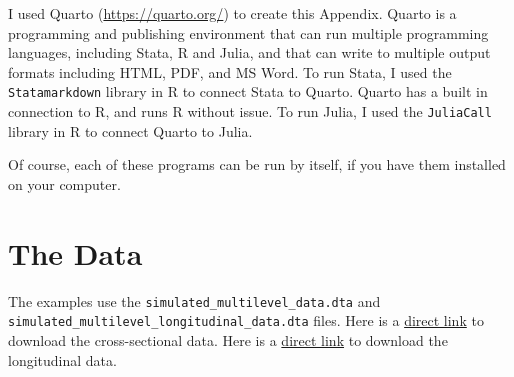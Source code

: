 \documentclass[
  letterpaper,
  DIV=11,
  numbers=noendperiod]{scrreprt}
\begin{document}
\begin{tcolorbox}[enhanced jigsaw, colframe=quarto-callout-tip-color-frame, bottomrule=.15mm, opacitybacktitle=0.6, bottomtitle=1mm, toptitle=1mm, colbacktitle=quarto-callout-tip-color!10!white, arc=.35mm, toprule=.15mm, opacityback=0, rightrule=.15mm, title=\textcolor{quarto-callout-tip-color}{\faLightbulb}\hspace{0.5em}{Running Statistical Packages in Quarto}, leftrule=.75mm, colback=white, breakable, coltitle=black, left=2mm, titlerule=0mm]

I used Quarto (\url{https://quarto.org/}) to create this Appendix.
Quarto is a programming and publishing environment that can run multiple
programming languages, including Stata, R and Julia, and that can write
to multiple output formats including HTML, PDF, and MS Word. To run
Stata, I used the \texttt{Statamarkdown} library in R to connect Stata
to Quarto. Quarto has a built in connection to R, and runs R without
issue. To run Julia, I used the \texttt{JuliaCall} library in R to
connect Quarto to Julia.

Of course, each of these programs can be run by itself, if you have them
installed on your computer.

\end{tcolorbox}

\section{The Data}\label{sec-data}

\begin{tcolorbox}[enhanced jigsaw, colframe=quarto-callout-note-color-frame, bottomrule=.15mm, opacitybacktitle=0.6, bottomtitle=1mm, toptitle=1mm, colbacktitle=quarto-callout-note-color!10!white, arc=.35mm, toprule=.15mm, opacityback=0, rightrule=.15mm, title=\textcolor{quarto-callout-note-color}{\faInfo}\hspace{0.5em}{Datasets}, leftrule=.75mm, colback=white, breakable, coltitle=black, left=2mm, titlerule=0mm]

The examples use the \texttt{simulated\_multilevel\_data.dta} and
\texttt{simulated\_multilevel\_longitudinal\_data.dta} files. Here is a
\href{https://github.com/agrogan1/multilevel-multilingual/raw/main/simulated_multilevel_data.dta}{direct
link} to download the cross-sectional data. Here is a
\href{https://github.com/agrogan1/multilevel-multilingual/raw/main/simulated_multilevel_longitudinal_data.dta}{direct
link} to download the longitudinal data.

\end{tcolorbox}
\end{document}
